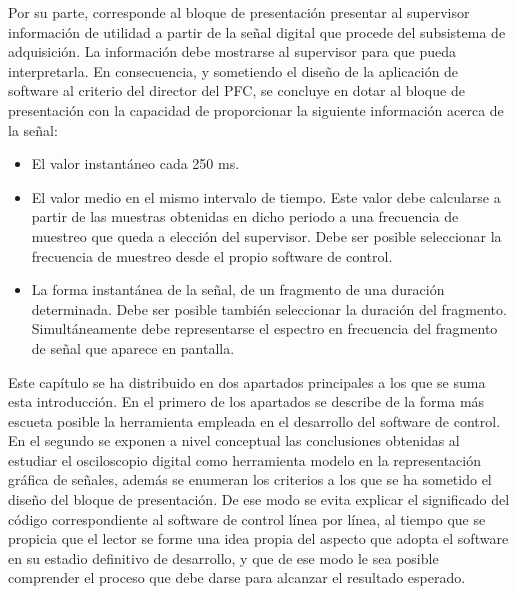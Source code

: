 Por su parte, corresponde al bloque de presentación presentar al supervisor
información de utilidad a partir de la señal digital que procede del
subsistema de adquisición. La información debe mostrarse al supervisor para
que pueda interpretarla. En consecuencia, y sometiendo el diseño de la
aplicación de software al criterio del director del PFC, se concluye en
dotar al bloque de presentación con la capacidad de proporcionar la
siguiente información acerca de la señal:

\begin{itemize}
	\item El valor instantáneo cada 250 ms.
	\item El valor medio en el mismo intervalo de tiempo. Este valor
		debe calcularse a partir de las muestras obtenidas en dicho
		periodo a una frecuencia de muestreo que queda a elección
		del supervisor. Debe ser posible seleccionar la frecuencia
		de muestreo desde el propio software de control.
	\item La forma instantánea de la señal, de un fragmento de una
		duración determinada. Debe ser posible también seleccionar
		la duración del fragmento. Simultáneamente debe
		representarse el espectro en frecuencia del fragmento de
		señal que aparece en pantalla.
\end{itemize}

Este capítulo se ha distribuido en dos apartados principales a los que se
suma esta introducción. En el primero de los apartados se describe de la
forma más escueta posible la herramienta empleada en el desarrollo del
software de control. En el segundo se exponen a nivel conceptual las
conclusiones obtenidas al estudiar el osciloscopio digital como herramienta
modelo en la representación gráfica de señales, además se enumeran los
criterios a los que se ha sometido el diseño del bloque de presentación. De
ese modo se evita explicar el significado del código correspondiente al
software de control línea por línea, al tiempo que se propicia que el
lector se forme una idea propia del aspecto que adopta el software en su
estadio definitivo de desarrollo, y que de ese modo le sea posible
comprender el proceso que debe darse para alcanzar el resultado esperado.

